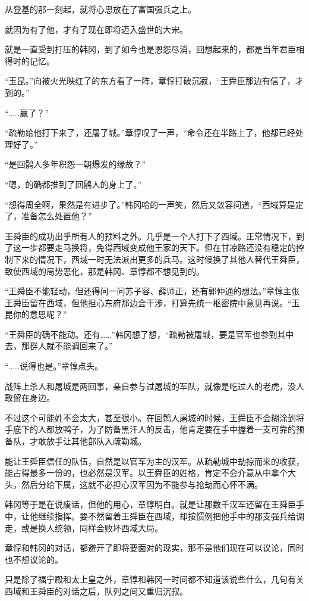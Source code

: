从登基的那一刻起，就将心思放在了富国强兵之上。

就因为有了他，才有了现在即将迈入盛世的大宋。

就是一直受到打压的韩冈，到了如今也是恩怨尽消，回想起来的，都是当年君臣相得时的记忆。

“玉昆。”向被火光映红了的东方看了一阵，章惇打破沉寂，“王舜臣那边有信了，才到的。”

“……赢了？”

“疏勒给他打下来了，还屠了城。”章惇叹了一声，“命令还在半路上了，他都已经处理好了。”

“是回鹘人多年积怨一朝爆发的缘故？”

“嗯，的确都推到了回鹘人的身上了。”

“想得周全啊，果然是有进步了。”韩冈哈的一声笑，然后又敛容问道，“西域算是定了，准备怎么处置他？”

王舜臣的成功出乎所有人的预料之外。几乎是一个人打下了西域。正常情况下，到了这一步都要走马换将，免得西域变成他王家的天下。但在甘凉路还没有稳定的控制下来的情况下，西域一时无法派出更多的兵马。这时候换了其他人替代王舜臣，致使西域的局势恶化，那是韩冈、章惇都不想见到的。

“王舜臣不能轻动，但还得问一问苏子容、薛师正，还有郭仲通的想法。”章惇主张王舜臣留在西域，但他担心东府那边会干涉，打算先统一枢密院中意见再说。“玉昆你的意思呢？”

“王舜臣的确不能动。还有……”韩冈想了想，“疏勒被屠城，要是官军也参到其中去，那群人就不能调回来了。”

“……说得也是。”章惇点头。

战阵上杀人和屠城是两回事，亲自参与过屠城的军队，就像是吃过人的老虎，没人敢留在身边。

不过这个可能姓不会太大，甚至很小。在回鹘人屠城的时候，王舜臣不会糊涂到将手底下的人都放鸭子，为了防备黑汗人的反击，他肯定要在手中握着一支可靠的预备队，才敢放手让其他部队入疏勒城。

能让王舜臣信任的队伍，自然是以官军为主的汉军。从疏勒城中劫掠而来的收获，能占得最多一份的，也必然是汉军。以王舜臣的姓格，肯定不会介意从中拿个大头，然后分给下属，这就不必担心汉军因为不能参与抢劫而心怀不满。

韩冈等于是在说废话，但他的用心，章惇明白。就是让那数千汉军还留在王舜臣手中，让他继续指挥。要不然留着王舜臣在西域，却按惯例把他手中的那支强兵给调走，或是换人统领，同样会败坏西域大局。

章惇和韩冈的对话，都避开了即将要面对的现实，那不是他们现在可以议论，同时也不想议论的。

只是除了福宁殿和太上皇之外，章惇和韩冈一时间都不知道该说些什么，几句有关西域和王舜臣的对话之后，队列之间又重归沉寂。

